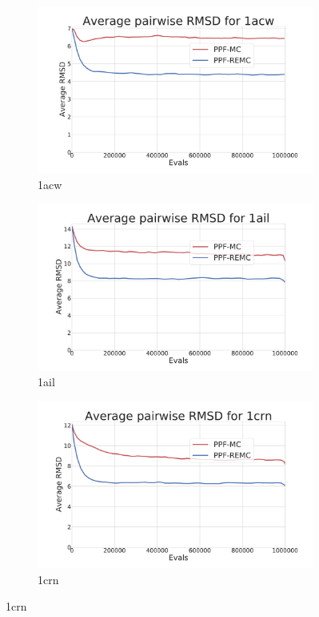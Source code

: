 \begin{figure}[ht]
  \begin{subfigure}{0.7\linewidth}
    \centering
    \includegraphics[width=1\linewidth]{Figuras/plots/rmsd_convergence/avg_rmsd_1acw.pdf}
    \caption{1acw}
  \end{subfigure}
%
  \begin{subfigure}{0.7\linewidth}
    \centering
    \includegraphics[width=1\linewidth]{Figuras/plots/rmsd_convergence/avg_rmsd_1ail.pdf}
    \caption{1ail}
  \end{subfigure}
%
  \begin{subfigure}{0.7\linewidth}
    \centering
    \includegraphics[width=1\linewidth]{Figuras/plots/rmsd_convergence/avg_rmsd_1crn.pdf}
    \caption{1crn}
  \end{subfigure}
\end{figure}

